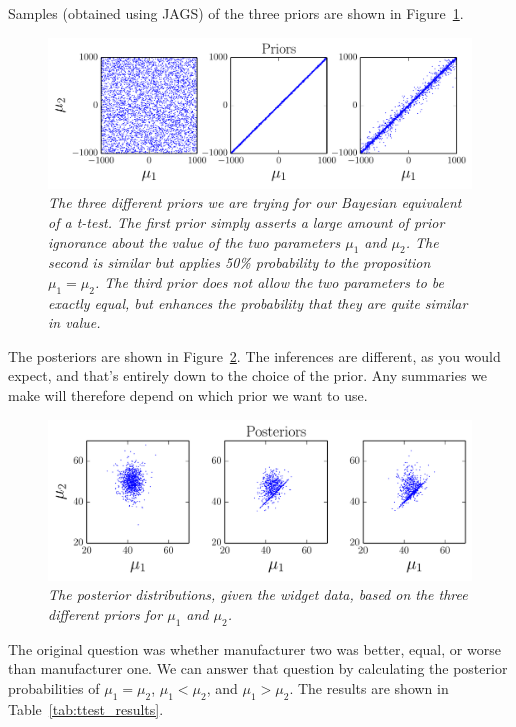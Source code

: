 Samples (obtained using JAGS) of the three priors are shown in
Figure~\ref{fig:ttest1}.
\begin{figure}[h]
\begin{center}
\includegraphics[scale=0.8]{Figures/ttest1.pdf}
\caption{\it The three different priors we are trying for our Bayesian
equivalent of a t-test. The first prior simply asserts a large amount of
prior ignorance about the value of the two parameters $\mu_1$ and $\mu_2$.
The second is similar but applies 50\% probability to the proposition
$\mu_1 = \mu_2$. The third prior does not allow the two parameters to be
exactly equal, but enhances the probability that they are quite similar
in value.\label{fig:ttest1}}
\end{center}
\end{figure}

The posteriors are shown in Figure~\ref{fig:ttest2}.
The inferences are different, as you would expect, and that's entirely down
to the choice of the prior. Any summaries we make will therefore depend on
which prior we want to use.
\begin{figure}[h]
\begin{center}
\includegraphics[scale=0.8]{Figures/ttest2.pdf}
\caption{\it The posterior distributions, given the widget data,
based on the three different priors for $\mu_1$ and $\mu_2$.\label{fig:ttest2}}
\end{center}
\end{figure}

The original question was whether manufacturer two was better, equal, or worse
than manufacturer one. We can answer that question by calculating the
posterior probabilities of $\mu_1 = \mu_2$, $\mu_1 < \mu_2$, and
$\mu_1 > \mu_2$. The results are shown in Table~\ref{tab:ttest_results}.

